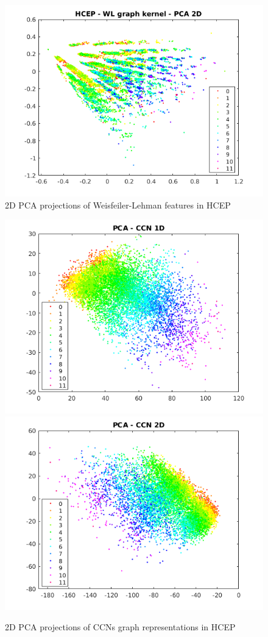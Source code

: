 \documentclass[sigchi]{acmart}
\theoremstyle{definition}
\theoremstyle{theorem}
\theoremstyle{corollary}
\theoremstyle{lemma}
\theoremstyle{remark}
\theoremstyle{prop}
\begin{document}
\begin{figure}
\caption{\label{fig:PCA-WL} 2D PCA projections of Weisfeiler-Lehman features in HCEP}
\centering
\includegraphics[scale=0.5]{PCA_WL}
\end{figure}
\begin{figure}
\caption{\label{fig:PCA-CCN} 2D PCA projections of CCNs graph representations in HCEP}
\centering
\includegraphics[scale=0.5]{PCA_CCN_1D}
\includegraphics[scale=0.5]{PCA_CCN_2D}
\end{figure}
\end{document}

